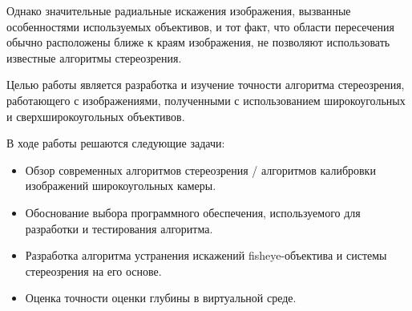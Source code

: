 Однако значительные радиальные искажения изображения, вызванные особенностями используемых объективов, и тот факт, что области пересечения 
обычно расположены ближе к краям изображения, не позволяют использовать известные алгоритмы стереозрения.                                       %

Целью работы является разработка и изучение точности алгоритма стереозрения, работающего с изображениями, полученными с использованием
широкоугольных и сверхширокоугольных объективов. 

В ходе работы решаются следующие задачи:
\begin{itemize}
    \item Обзор современных алгоритмов стереозрения / алгоритмов калибровки изображений широкоугольных камеры.
    \item Обоснование выбора программного обеспечения, используемого для разработки и тестирования алгоритма. 
    \item Разработка алгоритма устранения искажений fisheye-объектива и системы стереозрения на его основе.                                     %
    \item Оценка точности оценки глубины в виртуальной среде.  
\end{itemize}
